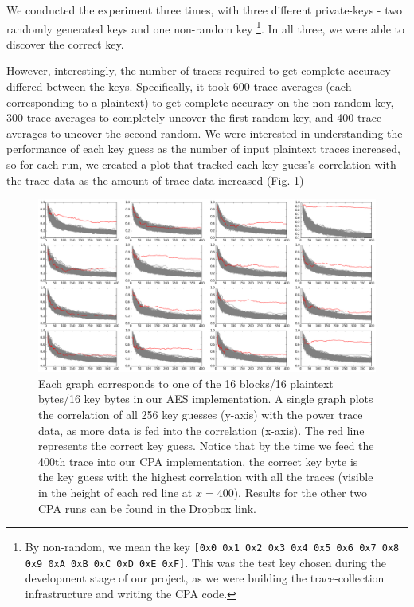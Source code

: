 \documentclass[journal]{ieee_style}
\begin{document}
We conducted the experiment three times, with three different private-keys - two randomly generated keys and one non-random key \footnote{By non-random, we mean the key \texttt{[0x0 0x1 0x2 0x3 0x4 0x5 0x6 0x7 0x8 0x9 0xA 0xB 0xC 0xD 0xE 0xF]}. This was the test key chosen during the development stage of our project, as we were building the trace-collection infrastructure and writing the CPA code.}. In all three, we were able to discover the correct key.

However, interestingly, the number of traces required to get complete accuracy differed between the keys. Specifically, it took 600 trace averages (each corresponding to a plaintext) to get complete accuracy on the non-random key, 300 trace averages to completely uncover the first random key, and 400 trace averages to uncover the second random. We were interested in understanding the performance of each key guess as the number of input plaintext traces increased, so for each run, we created a plot that tracked each key guess's correlation with the trace data as the amount of trace data increased (Fig. \ref{results_random2})

\begin{figure}[!t]
\centering
\includegraphics[width=7in]{12-04-15-19-46-23-newrandomkey2-corr-evolution}
\caption{Each graph corresponds to one of the 16 blocks/16 plaintext bytes/16 key bytes in our AES implementation. A single graph plots the correlation of all 256 key guesses (y-axis) with the power trace data, as more data is fed into the correlation (x-axis). The red line represents the correct key guess. Notice that by the time we feed the 400th trace into our CPA implementation, the correct key byte is the key guess with the highest correlation with all the traces (visible in the height of each red line at $x=400$). Results for the other two CPA runs can be found in the Dropbox link.}
\label{results_random2}
\end{figure}
\end{document}
